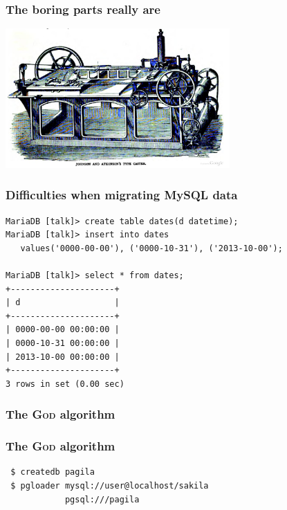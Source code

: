 \documentclass{beamer}
\begin{document}
\begin{frame}
  \frametitle{The boring parts really are}

  
  \begin{center}
    \includegraphics[height=2.1in]{type-casting-machine.jpg}
  \end{center}
\end{frame}

\begin{frame}[fragile]
  \frametitle{Difficulties when migrating MySQL data}
  
  \vfill

\begin{verbatim}
MariaDB [talk]> create table dates(d datetime);
MariaDB [talk]> insert into dates
   values('0000-00-00'), ('0000-10-31'), ('2013-10-00');

MariaDB [talk]> select * from dates;
+---------------------+
| d                   |
+---------------------+
| 0000-00-00 00:00:00 |
| 0000-10-31 00:00:00 |
| 2013-10-00 00:00:00 |
+---------------------+
3 rows in set (0.00 sec)
\end{verbatim}
\end{frame}

\begin{frame}[fragile]
  \frametitle{The \textsc{God} algorithm}

\end{frame}

\begin{frame}[fragile]
  \frametitle{The \textsc{God} algorithm}

  \vfill

\begin{verbatim}
 $ createdb pagila
 $ pgloader mysql://user@localhost/sakila
            pgsql:///pagila
\end{verbatim}
\end{frame}
\end{document}
